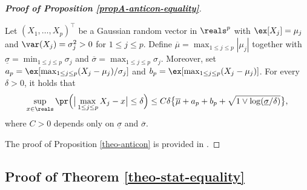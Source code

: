 \begin{proof}[\textnormal{\textbf{Proof of Proposition \ref{propA-anticon-equality}}}]
{\begin{propA}\label{theo-anticon}
Let $(X_1,\ldots,X_p)^\top$ be a Gaussian random vector in $\reals^p$ with $\ex[X_j] = \mu_j$ and $\var(X_j) = \sigma_j^2 > 0$ for $1 \le j \le p$. Define $\overline{\mu} = \max_{1 \le j \le p} |\mu_j|$ together with $\underline{\sigma} = \min_{1 \le j \le p} \sigma_j$ and $\overline{\sigma} = \max_{1 \le j \le p} \sigma_j$. Moreover, set $a_p = \ex[ \max_{1 \le j \le p} (X_j-\mu_j)/\sigma_j ]$ and $b_p = \ex[ \max_{1 \le j \le p} (X_j-\mu_j) ]$. For every $\delta > 0$, it holds that
\[ \sup_{x \in \reals} \pr \Big( \big| \max_{1 \le j \le p} X_j - x \big| \le \delta \Big) \le C \delta \big\{ \overline{\mu} + a_p + b_p + \sqrt{1 \vee \log(\underline{\sigma}/\delta)} \big\}, \]
where $C > 0$ depends only on $\underline{\sigma}$ and $\overline{\sigma}$. 
\end{propA} 
The proof of Proposition \ref{theo-anticon} is provided in \cite{KhismatullinaVogt2018}.}
\end{proof}



\subsection*{Proof of Theorem \ref{theo-stat-equality}}


